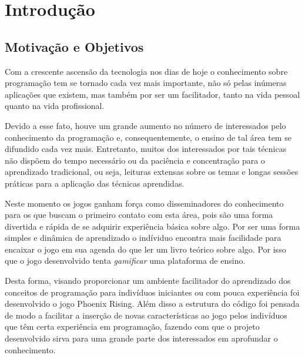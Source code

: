 \chapter{Introdução}
\label{cap:introducao}

\section{Motivação e Objetivos}

Com a crescente ascensão da tecnologia nos dias de hoje o conhecimento sobre
programação tem se tornado cada vez mais importante, não só pelas inúmeras
aplicações que existem, mas também por ser um facilitador, tanto na vida
pessoal quanto na vida profissional.

Devido a esse fato, houve um grande aumento no número de interessados pelo
conhecimento da programação e, consequentemente, o ensino de tal área tem se
difundido cada vez mais. Entretanto, muitos dos interessados por tais técnicas
não dispõem do tempo necessário ou da paciência e concentração para o 
aprendizado tradicional, ou seja, leituras extensas sobre os temas e longas 
sessões práticas para a aplicação das técnicas aprendidas.

Neste momento os jogos ganham força como disseminadores do conhecimento para os 
que buscam o primeiro contato com esta área, pois são
uma forma divertida e rápida de se adquirir experiência básica sobre algo.
Por ser uma forma simples e dinâmica de aprendizado o indíviduo encontra mais
facilidade para encaixar o jogo em sua agenda do que ler um livro teórico sobre
algo. Por isso que o jogo desenvolvido tenta \textit{gamificar} uma plataforma 
de ensino.

Desta forma, visando proporcionar um ambiente facilitador do aprendizado dos
conceitos de programação para indivíduos iniciantes ou com pouca experiência
foi desenvolvido o jogo Phoenix Rising. Além disso a estrutura do código foi
pensada de modo a facilitar a inserção de novas características ao jogo
pelos indivíduos que têm certa experiência em programação, fazendo com que
o projeto desenvolvido sirva para uma grande parte dos interessados em 
aprofundar o conhecimento.


